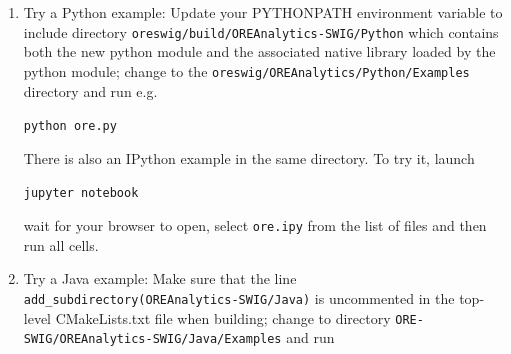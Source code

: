 \documentclass[12pt, a4paper]{article}
\begin{document}
{\begin{enumerate}
\medskip
To build on Windows using CMake and an existing Visual Studio installation you can e.g. run
this from the top-level oreswig directory

{\footnotesize
{\tt mkdir build $\backslash$} \\
{\tt cmake -G "Visual Studio 15 2017" $\backslash$}\\
\hspace{1cm} {\tt -A x64 $\backslash$}\\
\hspace{1cm} {\tt -D SWIG\_DIR=C:$\backslash$dev$\backslash$swigwin$\backslash$Lib $\backslash$}\\
\hspace{1cm} {\tt -D SWIG\_EXECUTABLE=C:$\backslash$dev$\backslash$swigwin$\backslash$swig.exe $\backslash$}\\
\hspace{1cm} {\tt -D ORE:PATHNAME=C:$\backslash$dev$\backslash$ORE$\backslash$master $\backslash$}\\
\hspace{1cm} {\tt -D BOOST\_ROOT=C:$\backslash$dev$\backslash$boost $\backslash$}\\
\hspace{1cm} {\tt -S OREAnalytics-SWIG/Python $\backslash$}\\
\hspace{1cm} {\tt -B build $\backslash$}\\
{\tt cmake --build build -v}
}

\medskip
By default this builds the OREAnalytics-Python bindings which include the wrapped parts of QuantLib, QuantExt, OREData and OREAnalytics.

\item Try a Python example: Update your PYTHONPATH environment variable to include directory {\tt oreswig/build/OREAnalytics-SWIG/Python} which contains both the new python module and the associated native library loaded by the python module;
change to the {\tt oreswig/OREAnalytics/Python/Examples} directory and run e.g.\\

\medskip
\centerline{\tt python ore.py}  

There is also an IPython example in the same directory. To try it, launch 

\medskip
\centerline{\tt jupyter notebook}  

wait for your browser to open, select {\tt ore.ipy} from the list of files and then run all cells.

\item Try a Java example: Make sure that the line {\tt add\_subdirectory(OREAnalytics-SWIG/Java)} 
is uncommented in the top-level CMakeLists.txt file when building; change to directory 
{\tt ORE-SWIG/OREAnalytics-SWIG/Java/Examples} and run


\end{enumerate}}
\end{document}
